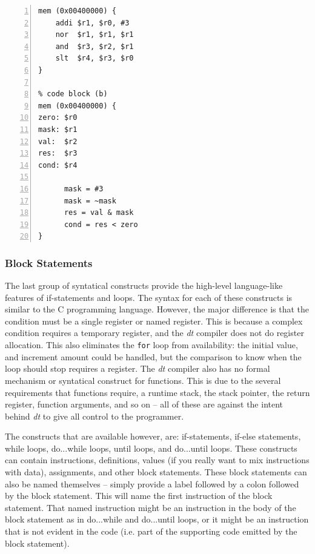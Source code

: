\begin{lstlisting}[label=code:assign,caption=Code example of equivalent instructions using (a) instruction mnemonics and (b) shorthand assignments,basicstyle=\footnotesize,numbers=left,numberstyle=\tiny,stepnumber=1, numbersep=6pt,frame=single,captionpos=b,escapechar=@]
% code block (a)
mem (0x00400000) {
    addi $r1, $r0, #3
    nor  $r1, $r1, $r1
    and  $r3, $r2, $r1
    slt  $r4, $r3, $r0
}

% code block (b)
mem (0x00400000) {
zero: $r0
mask: $r1
val:  $r2
res:  $r3
cond: $r4

      mask = #3
      mask = ~mask
      res = val & mask
      cond = res < zero
}
\end{lstlisting}

\subsubsection{Block Statements}

The last group of syntatical constructs provide the 
high-level language-like features of if-statements and loops.
The syntax for each of these constructs is similar 
to the C programming language.  However, the major 
difference is that the condition must be a single 
register or named register.  This is because a complex
condition requires a temporary register, and the \emph{dt}
compiler does not do register allocation.  This also 
eliminates the \texttt{for} loop from availability: the 
initial value, and increment amount could be handled, 
but the comparison to know when the loop should stop 
requires a register.  The \emph{dt} compiler also 
has no formal mechanism or syntatical construct for 
functions.  This is due to the several requirements 
that functions require, a runtime stack, the stack pointer, 
the return register, function arguments, and so on -- all of 
these are against the intent behind \emph{dt} to give 
all control to the programmer.

The constructs that are available however, are: if-statements,
if-else statements, while loops, do...while loops, until loops,
and do...until loops.  These constructs can contain instructions,
definitions, values (if you really want to mix instructions with
data), assignments, and other block statements.  These block 
statements can also be named themselves -- simply provide a 
label followed by a colon followed by the block statement.  This 
will name the first instruction of the block statement. That named instruction 
might be an instruction in the body of the block statement as 
in do...while and do...until loops, or it might be an 
instruction that is not evident in the code (i.e. part of the 
supporting code emitted by the block statement).


